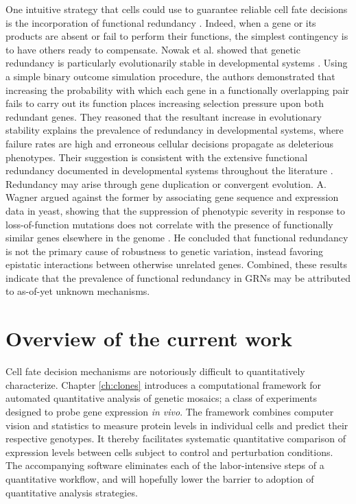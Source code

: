 One intuitive strategy that cells could use to guarantee reliable cell fate decisions is the incorporation of functional redundancy \cite{Hartman2001,McAdams1999}. Indeed, when a gene or its products are absent or fail to perform their functions, the simplest contingency is to have others ready to compensate. Nowak et al. showed that genetic redundancy is particularly evolutionarily stable in developmental systems \cite{Nowak1997}. Using a simple binary outcome simulation procedure, the authors demonstrated that increasing the probability with which each gene in a functionally overlapping pair fails to carry out its function places increasing selection pressure upon both redundant genes. They reasoned that the resultant increase in evolutionary stability explains the prevalence of redundancy in developmental systems, where failure rates are high and erroneous cellular decisions propagate as deleterious phenotypes. Their suggestion is consistent with the extensive functional redundancy documented in developmental systems throughout the literature \cite{Kitano2004}. Redundancy may arise through gene duplication or convergent evolution. A. Wagner argued against the former by associating gene sequence and expression data in yeast, showing that the suppression of phenotypic severity in response to loss-of-function mutations does not correlate with the presence of functionally similar genes elsewhere in the genome \cite{Wagner2000}. He concluded that functional redundancy is not the primary cause of robustness to genetic variation, instead favoring epistatic interactions between otherwise unrelated genes. Combined, these results indicate that the prevalence of functional redundancy in GRNs may be attributed to as-of-yet unknown mechanisms.

\section{Overview of the current work}

Cell fate decision mechanisms are notoriously difficult to quantitatively characterize. Chapter \ref{ch:clones} introduces a computational framework for automated quantitative analysis of genetic mosaics; a class of experiments designed to probe gene expression \textit{in vivo}. The framework combines computer vision and statistics to measure protein levels in individual cells and predict their respective genotypes. It thereby facilitates systematic quantitative comparison of expression levels between cells subject to control and perturbation conditions. The accompanying software eliminates each of the labor-intensive steps of a quantitative workflow, and will hopefully lower the barrier to adoption of quantitative analysis strategies. 

